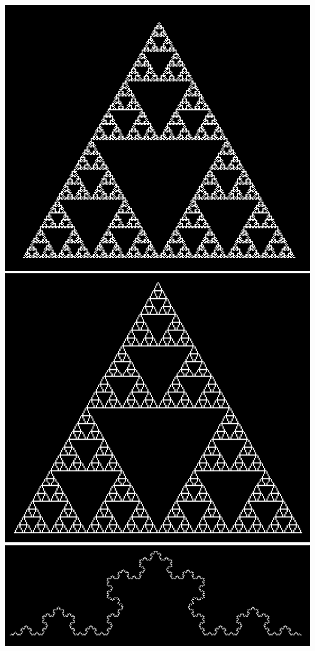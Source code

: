 \documentclass{article}
\begin{document}
\includegraphics[width=\textwidth]{pictures/sierpinski.png}
\includegraphics[width=\textwidth]{pictures/sierpinksi2.png}
\includegraphics[width=\textwidth]{pictures/koch.png}
\end{document}
